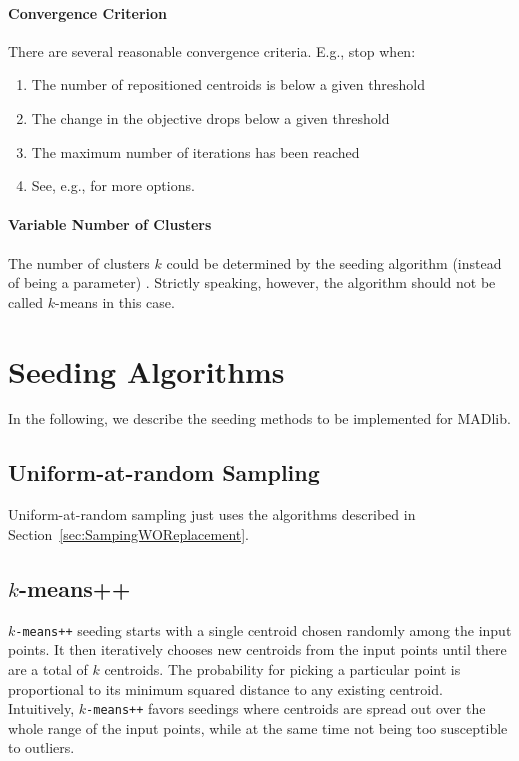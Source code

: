 \paragraph{Convergence Criterion}

There are several reasonable convergence criteria. E.g., stop when:
\begin{enumerate}
	\item The number of repositioned centroids is below a given threshold
	\item The change in the objective drops below a given threshold
	\item The maximum number of iterations has been reached
	\item See, e.g., \textcite[Section~16.4]{CS08a} for more options.
\end{enumerate}

\paragraph{Variable Number of Clusters}

The number of clusters $k$ could be determined by the seeding algorithm (instead of being a parameter) \cite{MNU00a}. Strictly speaking, however, the algorithm should not be called $k$-means in this case.


\section{Seeding Algorithms}

In the following, we describe the seeding methods to be implemented for MADlib.

\subsection{Uniform-at-random Sampling}

Uniform-at-random sampling just uses the algorithms described in Section~\ref{sec:SampingWOReplacement}.

\subsection[k-means++]{$k$-means++}

\texttt{$k$-means++} seeding \cite{AV07a} starts with a single centroid chosen randomly among the input points. It then iteratively chooses new centroids from the input points until there are a total of $k$ centroids. The probability for picking a particular point is proportional to its minimum squared distance to any existing centroid. Intuitively, \texttt{$k$-means++} favors seedings where centroids are spread out over the whole range of the input points, while at the same time not being too susceptible to outliers.

